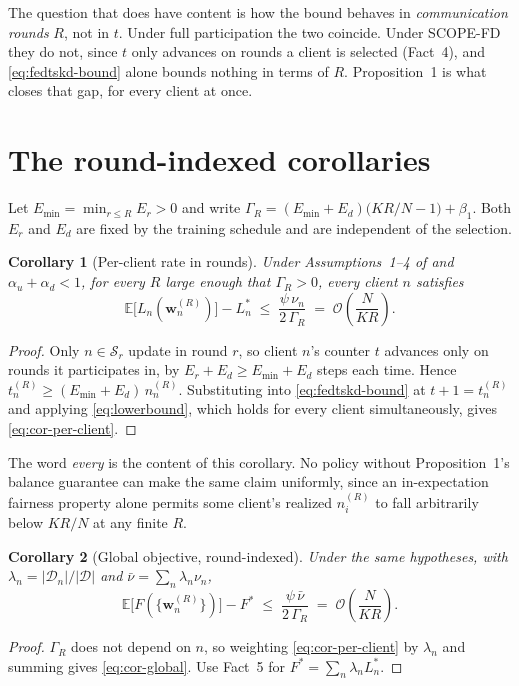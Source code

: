 \documentclass[11pt]{article}
\newtheorem{corollary}{Corollary}
\begin{document}
The question that does have content is how the bound behaves in
\emph{communication rounds} $R$, not in $t$. Under full participation the two
coincide. Under SCOPE-FD they do not, since $t$ only advances on rounds a
client is selected (Fact~4), and \eqref{eq:fedtskd-bound} alone bounds nothing
in terms of $R$. Proposition~1 is what closes that gap, for every client at
once.

\section{The round-indexed corollaries}

Let $E_{\min}=\min_{r\le R}E_r>0$ and write
$\Gamma_R = (E_{\min}+E_d)\bigl(KR/N-1\bigr)+\beta_1$. Both $E_r$ and $E_d$
are fixed by the training schedule and are independent of the selection.

\begin{corollary}[Per-client rate in rounds]
\label{cor:per-client}
Under Assumptions~1--4 of \cite{mu2024fedtskd} and $\alpha_u+\alpha_d<1$, for
every $R$ large enough that $\Gamma_R>0$, every client $n$ satisfies
\begin{equation}
\mathbb{E}\bigl[L_n(\bm w_n^{(R)})\bigr] - L_n^{*}
\;\le\; \frac{\psi\,\nu_n}{2\,\Gamma_R}
\;=\; \mathcal{O}\!\left(\frac{N}{KR}\right).
\label{eq:cor-per-client}
\end{equation}
\end{corollary}

\begin{proof}
Only $n\in\mathcal{S}_r$ update in round $r$, so client $n$'s counter $t$
advances only on rounds it participates in, by $E_r+E_d\ge E_{\min}+E_d$
steps each time. Hence $t_n^{(R)}\ge(E_{\min}+E_d)\,n_n^{(R)}$. Substituting
into \eqref{eq:fedtskd-bound} at $t+1=t_n^{(R)}$ and applying
\eqref{eq:lowerbound}, which holds for every client simultaneously, gives
\eqref{eq:cor-per-client}.
\end{proof}

The word \emph{every} is the content of this corollary. No policy without
Proposition~1's balance guarantee can make the same claim uniformly, since an
in-expectation fairness property alone permits some client's realized
$n_i^{(R)}$ to fall arbitrarily below $KR/N$ at any finite $R$.

\begin{corollary}[Global objective, round-indexed]
\label{cor:global}
Under the same hypotheses, with $\lambda_n=|\mathcal{D}_n|/|\mathcal{D}|$
and $\bar\nu=\sum_n\lambda_n\nu_n$,
\begin{equation}
\mathbb{E}\bigl[F(\{\bm w_n^{(R)}\})\bigr] - F^{*}
\;\le\; \frac{\psi\,\bar\nu}{2\,\Gamma_R}
\;=\; \mathcal{O}\!\left(\frac{N}{KR}\right).
\label{eq:cor-global}
\end{equation}
\end{corollary}
\begin{proof}
$\Gamma_R$ does not depend on $n$, so weighting \eqref{eq:cor-per-client} by
$\lambda_n$ and summing gives \eqref{eq:cor-global}. Use Fact~5 for
$F^{*}=\sum_n\lambda_n L_n^{*}$.
\end{proof}
\end{document}
